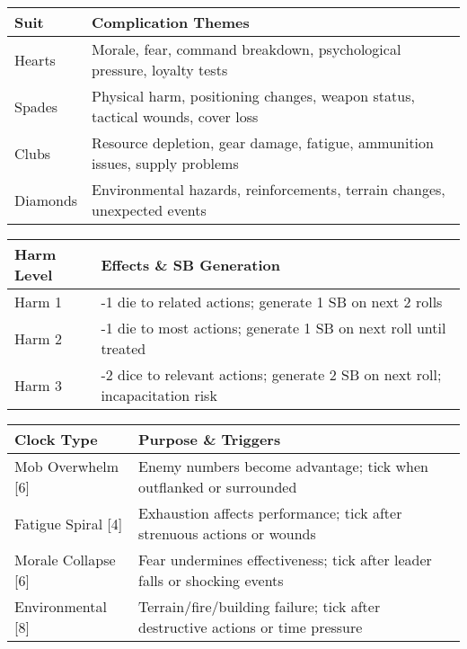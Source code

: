 \begin{fatebox}
\begin{tabularx}{\textwidth}{lX}
\toprule
\textbf{Suit} & \textbf{Complication Themes} \\
\midrule
Hearts & Morale, fear, command breakdown, psychological pressure, loyalty tests \\
Spades & Physical harm, positioning changes, weapon status, tactical wounds, cover loss \\
Clubs & Resource depletion, gear damage, fatigue, ammunition issues, supply problems \\
Diamonds & Environmental hazards, reinforcements, terrain changes, unexpected events \\
\bottomrule
\end{tabularx}
\end{fatebox}

\begin{fatebox}
\begin{tabularx}{\textwidth}{lX}
\toprule
\textbf{Harm Level} & \textbf{Effects \& SB Generation} \\
\midrule
Harm 1 & -1 die to related actions; generate 1 SB on next 2 rolls \\
Harm 2 & -1 die to most actions; generate 1 SB on next roll until treated \\
Harm 3 & -2 dice to relevant actions; generate 2 SB on next roll; incapacitation risk \\
\bottomrule
\end{tabularx}
\end{fatebox}

\begin{fatebox}
\begin{tabularx}{\textwidth}{lX}
\toprule
\textbf{Clock Type} & \textbf{Purpose \& Triggers} \\
\midrule
Mob Overwhelm [6] & Enemy numbers become advantage; tick when outflanked or surrounded \\
Fatigue Spiral [4] & Exhaustion affects performance; tick after strenuous actions or wounds \\
Morale Collapse [6] & Fear undermines effectiveness; tick after leader falls or shocking events \\
Environmental [8] & Terrain/fire/building failure; tick after destructive actions or time pressure \\
\bottomrule
\end{tabularx}
\end{fatebox}

